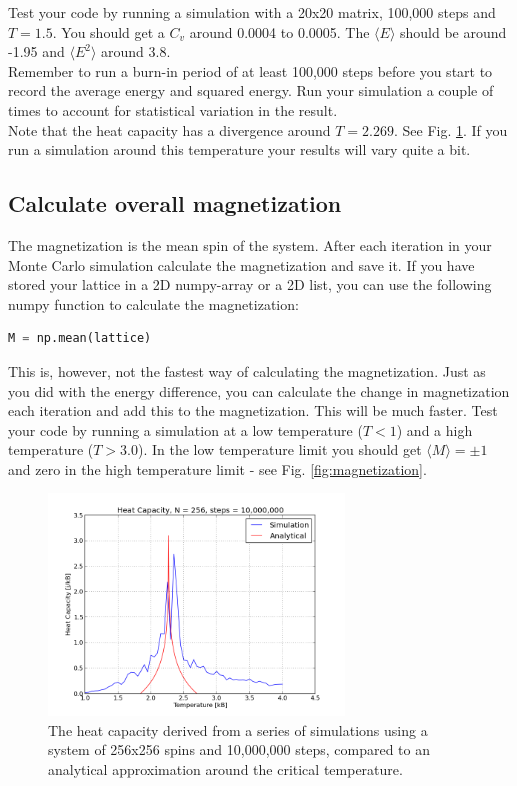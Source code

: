 \documentclass{article}
\begin{document}
Test your code by running a simulation with a 20x20 matrix, 100,000 steps and $T = 1.5$.
You should get a $C_v$ around
0.0004 to 0.0005.
The $\langle E \rangle$ should be around -1.95 and $\langle E^2 \rangle$ around 3.8.\\

Remember to run a burn-in period of at
least 100,000 steps before you start to record the
average energy and squared energy.
Run your simulation a couple of times to account
for statistical variation in the result.\\

Note that the heat capacity has a divergence around
$T = 2.269$. See Fig. \ref{fig:heat}.
If you run a simulation around this temperature your results will vary quite a bit.


\subsection{Calculate overall magnetization}

The magnetization is the mean spin of the system.
After each iteration in your Monte Carlo simulation
calculate the magnetization and save it.
If you have stored your lattice in a 2D numpy-array or a 2D list,
you can use the following numpy function to calculate the magnetization:
\begin{lstlisting}[language=python]
M = np.mean(lattice)
\end{lstlisting}

This is, however, not the fastest way of calculating the magnetization.
Just as you did with the energy difference,
you can calculate the change in magnetization each iteration and
add this to the magnetization. This will be much faster.
Test your code by running a simulation at a low temperature ($T < 1$) and a
high temperature ($T > 3.0$). In the low temperature limit
you should get $\langle M \rangle = \pm 1$ and zero in the high
temperature limit - see Fig. \ref{fig:magnetization}.


\begin{figure}[p]
  \centering
  \includegraphics[width=0.7\textwidth]{cv_anal.png}
  \caption{The heat capacity derived from a series of simulations using a
  system of 256x256 spins and 10,000,000 steps,
  compared to an analytical approximation around the critical temperature.}
  \label{fig:heat}
\end{figure}
\end{document}
